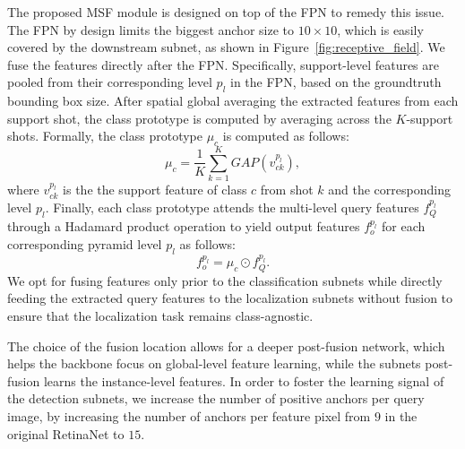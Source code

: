 \documentclass[10pt,twocolumn,letterpaper]{article}
\begin{document}
The proposed MSF module is designed on top of the FPN to remedy this issue. The FPN by design limits the biggest anchor size to $10\times10$, which is easily covered by the downstream subnet, as shown in Figure~\ref{fig:receptive_field}. We fuse the features directly after the FPN. Specifically, support-level features are pooled from their corresponding level $p_l$ in the FPN, based on the groundtruth bounding box size. After spatial global averaging the extracted features from each support shot, the class prototype is computed by averaging across the $K$-support shots. Formally, the class prototype $\mu_c$ is computed as follows:
\begin{equation}
    \mu_c = \frac{1}{K}\sum_{k=1}^{K} \textit{GAP}(v_{ck}^{p_l}),
\end{equation}
where $v_{ck}^{p_l}$ is the the support feature of class $c$ from shot $k$ and the corresponding level $p_l$.
Finally, each class prototype attends the multi-level query features $f_Q^{p_l}$ through a Hadamard product operation to yield output features $f_o^{p_l}$ for each corresponding pyramid level $p_l$ as follows:
\begin{equation}
   f_o^{p_l} = \mu_c \odot f_{Q}^{p_l}.
\end{equation}
We opt for fusing features only prior to the classification subnets while directly feeding the extracted query features to the localization subnets without fusion to ensure that the localization task remains class-agnostic.

The choice of the fusion location allows for a deeper post-fusion network, which helps the backbone focus on global-level feature learning, while the subnets post-fusion learns the instance-level features. In order to foster the learning signal of the detection subnets, we increase the number of positive anchors per query image, by increasing the number of anchors per feature pixel from $9$ in the original RetinaNet to $15$. 
\end{document}
